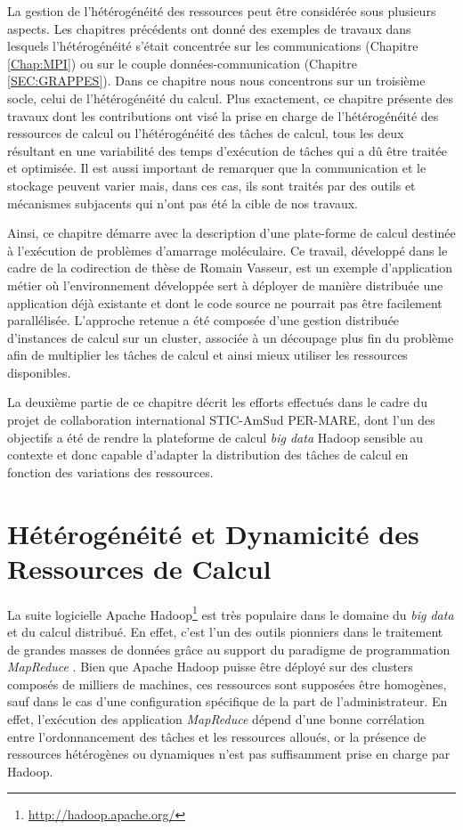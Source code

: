 \begin{resume}
La gestion de l'hétérogénéité des ressources peut être considérée sous plusieurs aspects. Les chapitres précédents ont donné des exemples de travaux dans lesquels l'hétérogénéité s'était concentrée sur les communications (Chapitre \ref{Chap:MPI}) ou sur le couple données-communication (Chapitre \ref{SEC:GRAPPES}). Dans ce chapitre nous nous concentrons sur un troisième socle, celui de l'hétérogénéité du calcul. Plus exactement, ce chapitre présente des travaux dont les contributions ont visé la prise en charge de l'hétérogénéité des ressources de calcul ou l'hétérogénéité des tâches de calcul, tous les deux résultant en une variabilité des temps d'exécution de tâches qui a dû être traitée et optimisée. Il est aussi important de remarquer que la communication et le stockage peuvent varier mais, dans ces cas, ils sont traités par des outils et mécanismes subjacents qui n'ont pas été la cible de nos travaux.

Ainsi, ce chapitre démarre avec la description d'une plate-forme de calcul destinée à l'exécution de problèmes d'amarrage moléculaire. Ce travail, développé dans le cadre de la codirection de thèse de Romain Vasseur, est un exemple d'application métier où l'environnement développée sert à déployer de manière distribuée une application déjà existante et dont le code source ne pourrait pas être facilement parallélisée. L'approche retenue a été composée d'une gestion distribuée d'instances de calcul sur un cluster, associée à un découpage plus fin du problème afin de multiplier les tâches de calcul et ainsi mieux utiliser les ressources disponibles.

La deuxième partie de ce chapitre décrit les efforts effectués dans le cadre du projet de collaboration international STIC-AmSud PER-MARE, dont l'un des objectifs a été de rendre la plateforme de calcul \textit{big data} Hadoop sensible au contexte et donc capable d'adapter la distribution des tâches de calcul en fonction des variations des ressources.

\end{resume}

\section{Hétérogénéité et Dynamicité des Ressources de Calcul} \label{sec:Guilherme}

La suite logicielle Apache Hadoop\footnote{\url{http://hadoop.apache.org/}} est très populaire dans le domaine du \textit{big data} et du calcul distribué. En effet, c'est l'un des outils pionniers dans le traitement de grandes masses de données grâce au support du paradigme de programmation \textit{MapReduce} \cite{Dean2008}. Bien que Apache Hadoop puisse être déployé sur des clusters composés de milliers de machines, ces ressources sont supposées être homogènes, sauf dans le cas d'une configuration spécifique de la part de l'administrateur. En effet, l'exécution des application \textit{MapReduce} dépend d'une bonne corrélation entre l'ordonnancement des tâches et les ressources alloués, or la présence de ressources hétérogènes ou dynamiques n'est pas suffisamment prise en charge par Hadoop. 

